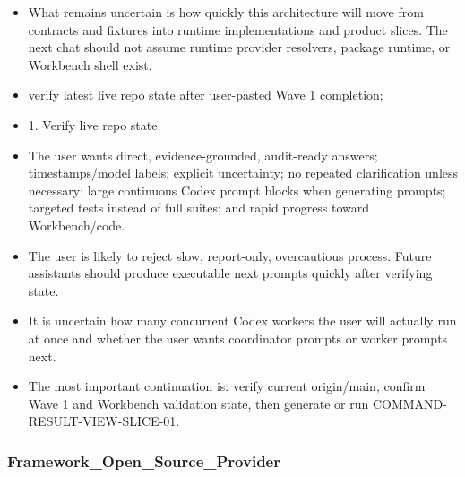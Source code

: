 \documentclass[11pt,a4paper]{report}
\begin{document}
\begin{itemize}
\item What remains uncertain is how quickly this architecture will move from contracts and fixtures into runtime implementations and product slices. The next chat should not assume runtime provider resolvers, package runtime, or Workbench shell exist.
\item verify latest live repo state after user-pasted Wave 1 completion;
\item 1. Verify live repo state.
\item The user wants direct, evidence-grounded, audit-ready answers; timestamps/model labels; explicit uncertainty; no repeated clarification unless necessary; large continuous Codex prompt blocks when generating prompts; targeted tests instead of full suites; and rapid progress toward Workbench/code.
\item The user is likely to reject slow, report-only, overcautious process. Future assistants should produce executable next prompts quickly after verifying state.
\item It is uncertain how many concurrent Codex workers the user will actually run at once and whether the user wants coordinator prompts or worker prompts next.
\item The most important continuation is: verify current origin/main, confirm Wave 1 and Workbench validation state, then generate or run COMMAND-RESULT-VIEW-SLICE-01.
\end{itemize}

\subsubsection{Framework\_Open\_Source\_Provider}
\end{document}
